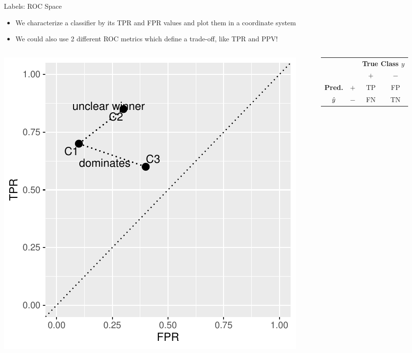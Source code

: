 \documentclass[11pt,compress,t,notes=noshow, xcolor=table]{beamer}
\newenvironment{knitrout}{}{} %
\begin{document}
\begin{vbframe}{Labels: ROC Space}
 \begin{itemize}
 \item We characterize a classifier by its TPR and FPR values and plot them in a coordinate
       system
 \item We could also use 2 different ROC metrics which define a trade-off, like TPR and PPV!
 \end{itemize}



\begin{columns}
\begin{column}{0.5\textwidth}

\begin{knitrout}\scriptsize
{}\color{fgcolor}

{\centering \includegraphics[width=\textwidth]{figure/eval_mclass_roc_sp_1} 

}



\end{knitrout}

\end{column}
\begin{column}{0.5\textwidth} 

\begin{center}
\small
\begin{tabular}{cc|cc}
    & & \multicolumn{2}{c}{\bfseries True Class $y$} \\
    & & $+$ & $-$ \\
    \hline
    \bfseries Pred.     & $+$ & TP & FP \\
              $\hat{y}$ & $-$ & FN & TN \\
\end{tabular}


\end{center}
\end{column}
\end{columns}
\end{vbframe}
\end{document}
